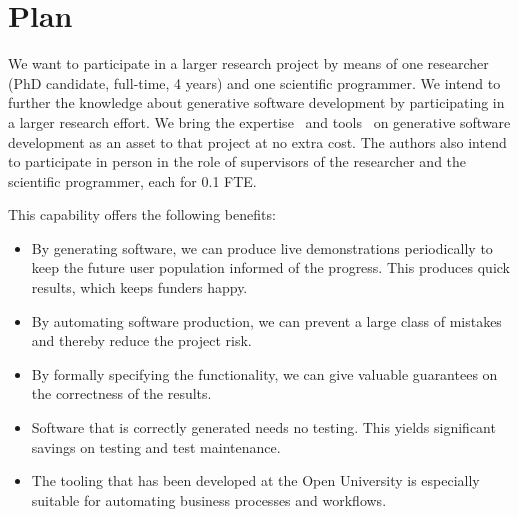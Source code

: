 \documentclass{elsarticle}
\begin{document}
\section{Plan}
   We want to participate in a larger research project by means of one researcher (PhD candidate, full-time, 4 years) and one scientific programmer.
   We intend to further the knowledge about generative software development by participating in a larger research effort.
   We bring the expertise~\cite{JoostenRAMiCS2017,Steenvoorden2022} and tools~\cite{Joosten-JLAMP2018,10.1145/3354166.3354182} on generative software development
   as an asset to that project at no extra cost.
   The authors also intend to participate in person in the role of supervisors of the researcher and the scientific programmer, each for 0.1 FTE.

   This capability offers the following benefits:
\begin{itemize}
    \item By generating software, we can produce live demonstrations periodically to keep the future user population informed of the progress.
    This produces quick results, which keeps funders happy.
    \item By automating software production, we can prevent a large class of mistakes and thereby reduce the project risk.
    \item By formally specifying the functionality, we can give valuable guarantees on the correctness of the results.
    \item Software that is correctly generated needs no testing. This yields significant savings on testing and test maintenance.
    \item The tooling that has been developed at the Open University is especially suitable for automating business processes and workflows.
\end{itemize}
\end{document}
